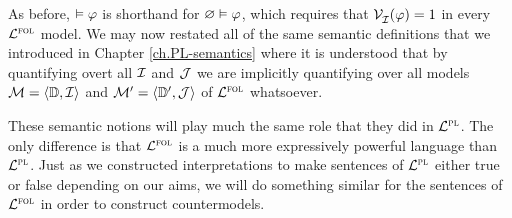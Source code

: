 As before, $\vDash\varphi$ is shorthand for $\varnothing\vDash\varphi$, which requires that $\mathcal{V}_{\mathcal{I}}^{}(\varphi) = 1$ in every $\mathcal{L}^{\textsc{fol}}$ model.
We may now restated all of the same semantic definitions that we introduced in Chapter \ref{ch.PL-semantics} where it is understood that by quantifying overt all $\mathcal{I}$ and $\mathcal{J}$ we are implicitly quantifying over all models $\mathcal{M} = \langle\mathbb{D}, \mathcal{I}\rangle$ and $\mathcal{M}' = \langle\mathbb{D}', \mathcal{J}\rangle$ of $\mathcal{L}^{\textsc{fol}}$ whatsoever.


These semantic notions will play much the same role that they did in $\mathcal{L}^{\textsc{pl}}$.
The only difference is that $\mathcal{L}^{\textsc{fol}}$ is a much more expressively powerful language than $\mathcal{L}^{\textsc{pl}}$.
Just as we constructed interpretations to make sentences of $\mathcal{L}^{\textsc{pl}}$ either true or false depending on our aims, we will do something similar for the sentences of $\mathcal{L}^{\textsc{fol}}$ in order to construct countermodels.






